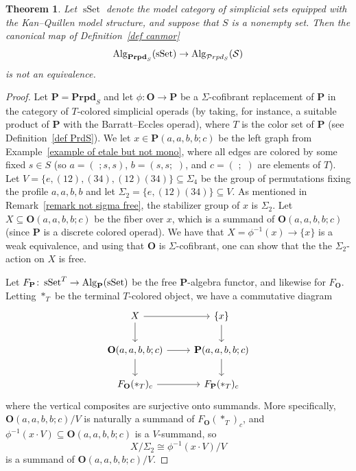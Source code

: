 \documentclass{amsart}
\newtheorem{theorem}{Theorem}
\numberwithin{theorem}{subsection}
\theoremstyle{definition}
\newcommand{\xsSet}{\operatorname{sSet}}
\newcommand{\xS}{\mathcal{S}}
\newcommand{\name}[1]{\ensuremath{\text{\textup{#1}}}}
\newcommand{\Alg}{\name{Alg}}
\newcommand{\calproperad}{\mathcal{P}rpd}
\begin{document}
\begin{theorem}\label{theorem non-rect}
	Let $\xsSet$ denote the model category of simplicial sets equipped with the Kan--Quillen model structure, and suppose that $S$ is a nonempty set. 
	Then the canonical map of Definition~\ref{def canmor}
	\[\Alg_{\mathbf{Prpd}_S}(\xsSet)\to \Alg_{\calproperad_S}(\xS) \] is \emph{not} an equivalence.
\end{theorem}
\begin{proof}
Let $\mathbf{P} = \mathbf{Prpd}_S$ and let $\phi \colon \mathbf{O} \to \mathbf{P}$ be a $\Sigma$-cofibrant replacement of $\mathbf{P}$ in the category of $T$-colored simplicial operads (by taking, for instance, a suitable product of $\mathbf{P}$ with the Barratt--Eccles operad), where $T$ is the color set of $\mathbf{P}$ (see Definition~\ref{def PrdS}).
We let $x \in \mathbf{P}(a,a,b,b;c)$ be the left graph from Example~\ref{example of etale but not mono}, where all edges are colored by some fixed $s\in S$ (so $a = (\,\,; s, s)$, $b=(s,s;\,\,)$, and $c=(\,\,;\,\,)$ are elements of $T$).
Let $V= \{ e, (12), (34), (12)(34) \} \subseteq \Sigma_4$ be the group of permutations fixing the profile $a,a,b,b$ and let $\Sigma_2 = \{e, (12)(34)\} \subseteq V$.
As mentioned in Remark~\ref{remark not sigma free}, the stabilizer group of $x$ is $\Sigma_2$.
Let $X \subseteq \mathbf{O}(a,a,b,b;c)$ be the fiber over $x$, which is a summand of $\mathbf{O}(a,a,b,b;c)$ (since $\mathbf{P}$ is a discrete colored operad).
We have that $X = \phi^{-1}(x) \to \{x\}$ is a weak equivalence, and using that $\mathbf{O}$ is $\Sigma$-cofibrant, one can show that the the $\Sigma_2$-action on $X$ is free.

Let $F_{\mathbf{P}} \colon \xsSet^T \to \Alg_{\mathbf{P}}(\xsSet)$ be the free $\mathbf{P}$-algebra functor, and likewise for $F_{\mathbf{O}}$.
Letting $\ast_T$ be the terminal $T$-colored object, we have a commutative diagram
\[ \begin{tikzcd}
X \rar \dar & \{ x\} \dar \\
\mathbf{O}(a,a,b,b;c) \rar \dar & \mathbf{P}(a,a,b,b;c) \dar \\
F_{\mathbf{O}}(\ast_T)_c \rar & F_{\mathbf{P}}(\ast_T)_c
\end{tikzcd} \]
where the vertical composites are surjective onto summands.
More specifically, $\mathbf{O}(a,a,b,b;c) / V$ is naturally a summand of $F_{\mathbf{O}}(\ast_T)_c$, and $\phi^{-1}(x \cdot V) \subseteq \mathbf{O}(a,a,b,b;c)$ is a $V$-summand, so 
\[
	X / \Sigma_2 \cong \phi^{-1}(x \cdot V) / V
\]
is a summand of $\mathbf{O}(a,a,b,b;c) / V$.


\end{proof}
\end{document}
